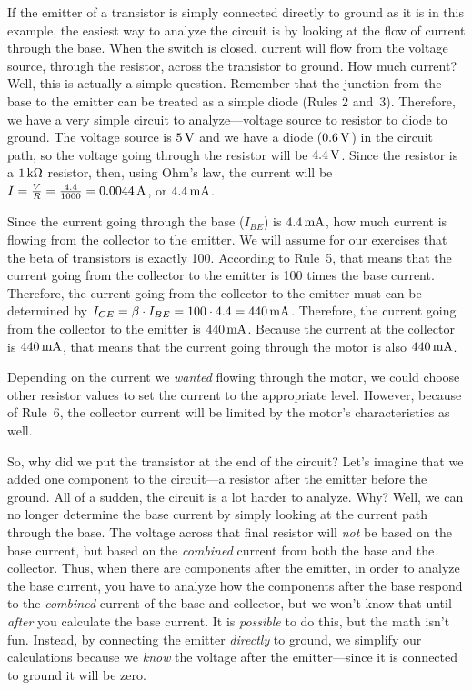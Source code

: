 
If the emitter of a transistor is simply connected directly to ground as it is in this example, the easiest way to analyze the circuit is by looking at the flow of current through the base.
When the switch is closed, current will flow from the voltage source, through the resistor, across the transistor to ground.
How much current?
Well, this is actually a simple question.
Remember that the junction from the base to the emitter can be treated as a simple diode (Rules 2 and~3).
Therefore, we have a very simple circuit to analyze---voltage source to resistor to diode to ground.
The voltage source is $5\,\si{\volt}$ and we have a diode ($0.6\,\si{\volt}$) in the circuit path, so the voltage going through the resistor will be $4.4\,\si{\volt}$.
Since the resistor is a $1\,\si{\kilo\ohm}$ resistor, then, using Ohm's law, the current will be $I = \frac{V}{R} = \frac{4.4}{1000} = 0.0044\,\si{\ampere}$, or $4.4\,\si{\milli\ampere}$.

Since the current going through the base ($I_{BE}$) is $4.4\,\si{\milli\ampere}$, how much current is flowing from the collector to the emitter.
We will assume for our exercises that the beta of transistors is exactly 100.
According to Rule~5, that means that the current going from the collector to the emitter is 100 times the base current.
Therefore, the current going from the collector to the emitter must can be determined by $I_{CE} = \beta \cdot I_{BE} = 100\cdot 4.4 = 440\,\si{\milli\ampere}$.
Therefore, the current going from the collector to the emitter is $440\,\si{\milli\ampere}$.  
Because the current at the collector is $440\,\si{\milli\ampere}$, that means that the current going through the motor is also $440\,\si{\milli\ampere}$.

Depending on the current we \emph{wanted} flowing through the motor, we could choose other resistor values to set the current to the appropriate level.
However, because of Rule~6, the collector current will be limited by the motor's characteristics as well.

So, why did we put the transistor at the end of the circuit?
Let's imagine that we added one component to the circuit---a resistor after the emitter before the ground.
All of a sudden, the circuit is a lot harder to analyze.
Why?
Well, we can no longer determine the base current by simply looking at the current path through the base.
The voltage across that final resistor will \emph{not} be based on the base current, but based on the \emph{combined} current from both the base and the collector.
Thus, when there are components after the emitter, in order to analyze the base current, you have to analyze how the components after the base respond to the \emph{combined} current of the base and collector, but we won't know that until \emph{after} you calculate the base current.
It is \emph{possible} to do this, but the math isn't fun.
Instead, by connecting the emitter \emph{directly} to ground, we simplify our calculations because we \emph{know} the voltage after the emitter---since it is connected to ground it will be zero.


